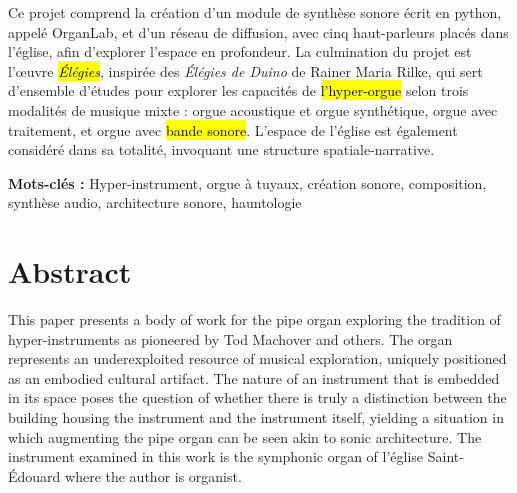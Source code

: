 \documentclass[12pt,twoside,maitrise]{dms_ks}
\theoremstyle{definition}
\begin{document}
Ce projet comprend la création d'un module de synthèse sonore écrit en python, appelé OrganLab, et d'un réseau de diffusion, avec cinq haut-parleurs placés dans l'église, afin d'explorer l'espace en profondeur. 
La culmination du projet est l'œuvre \hl{\textit{Élégies}}, inspirée des \textit{Élégies de Duino} de Rainer Maria Rilke, qui sert d'ensemble d'études pour explorer les capacités de \hl{l'hyper-orgue} selon trois modalités de musique mixte : orgue acoustique et orgue synthétique, orgue avec traitement, et orgue avec \hl{bande sonore}. 
L'espace de l'église est également considéré dans sa totalité, invoquant une structure spatiale-narrative. 

\textbf{Mots-clés :} Hyper-instrument, orgue à tuyaux, création sonore, composition, synthèse audio, architecture sonore, hauntologie



\anglais

\chapter*{Abstract}

This paper presents a body of work for the pipe organ exploring the tradition of hyper-instruments as pioneered by Tod Machover and others. 
The organ represents an underexploited resource of musical exploration, uniquely positioned as an embodied cultural artifact. 
The nature of an instrument that is embedded in its space poses the question of whether there is truly a distinction between the building housing the instrument and the instrument itself, yielding a situation in which augmenting the pipe organ can be seen akin to sonic architecture. 
The instrument examined in this work is the symphonic organ of l'église Saint-Édouard where the author is organist. 
\end{document}
